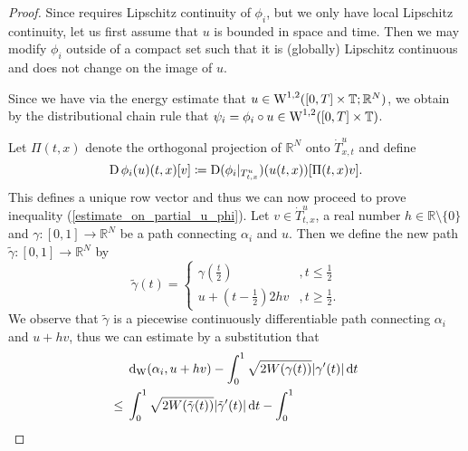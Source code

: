 \begin{proof}
	Since  requires Lipschitz continuity of $ \phi_{ i } $, but we only have local Lipschitz continuity, let us first assume that $ u $ is bounded in space and time. Then we may modify $ \phi_{ i } $ outside of a compact set such that it is (globally) Lipschitz continuous and does not change on the image of $ u $.
	
	Since we have via the energy estimate that $ u \in \operatorname{W}^{ 1 , 2 } ( [ 0 , T 
	] \times \operatorname{\mathbb{T}} ; \mathbb{ R }^{ N } ) $, we obtain by the 
	distributional chain rule  
	that $ \psi_{ i } = \phi_{ i } \circ u \in \operatorname{W}^{ 1 , 2 } ( [ 0, T ] \times 
	\operatorname{\mathbb{T}} ) $.
	
	Let $ \Pi ( t , x ) $ denote the orthogonal projection of $ \mathbb{ R }^{ N } $ onto $ \dot{ T }_{ x, t }^{ u } $ and define 
	\begin{equation*}
		\operatorname{D} \phi_{ i } ( u ) ( t, x ) [ v ]
		\coloneqq
		\operatorname{D} ( \phi_{ i } |_{ T_{ t , x }^{ u } } ) ( u ( t , x ) ) [ \Pi ( t , x ) v ].
	\end{equation*}
	This defines a unique row vector and thus we can now proceed to prove inequality (\ref{estimate_on_partial_u_phi}).
	Let $ v \in \dot{ T }_{ t, x }^{ u } $, a real number $ h \in \mathbb{ R } \setminus \{ 0 \} $ and $ \gamma \colon [ 0 , 1 ] \to \mathbb{ R }^{ N } $ be a path connecting $ \alpha_{ i } $ and $ u $. Then we define the new path $ \tilde{ \gamma } \colon [ 0 , 1 ] \to \mathbb{ R }^{ N } $ by 
	\begin{equation*}
		\tilde{ \gamma } ( t ) =
		\begin{cases}
			\gamma ( \frac{ t }{ 2 } ) 
			& , t \leq \frac{ 1 }{ 2 }
			\\
			u + 
			\left( t - \frac{ 1 }{ 2 } \right)
			2 h v
			&, t \geq \frac{ 1 }{ 2 }.
		\end{cases}
	\end{equation*}
	We observe that $ \tilde{ \gamma } $ is a piecewise continuously differentiable path connecting $ \alpha_{i } $ and $ u + h v $, thus we can estimate by a substitution that
	\begin{align*}
		& \geodesic_distance ( \alpha_{ i } , u + hv )
		-
		\int_{ 0 }^{ 1 }
			\sqrt{
				2 W ( \gamma ( t ) ) }
			\abs{ \gamma ' ( t ) }
		\dd{ t }
		\\
		\leq {} &
		\int_{ 0 }^{ 1 }
			\sqrt{ 2 W ( \tilde{ \gamma } ( t ) ) } 
			\abs{ \tilde{ \gamma } ' ( t ) }
		\dd{ t }
		-
		\int_{ 0 }^{ 1 }

\end{align*}
\end{proof}
